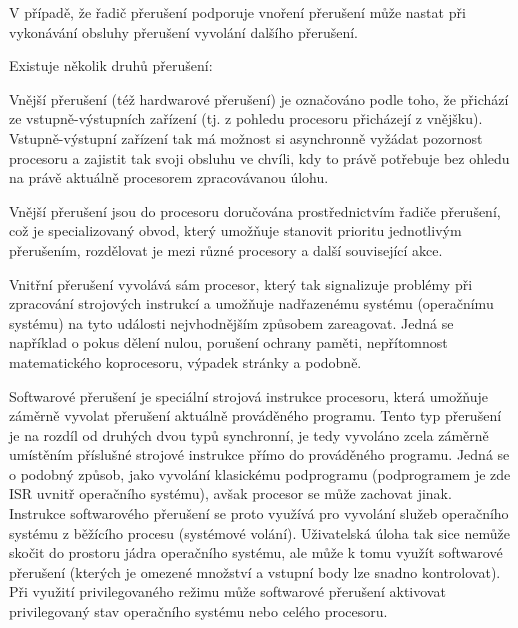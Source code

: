 V případě, že řadič přerušení podporuje vnoření přerušení může nastat při vykonávání obsluhy přerušení vyvolání dalšího přerušení.


Existuje několik druhů přerušení:

\vskip 4mm
\vskip 4mm


Vnější přerušení (též hardwarové přerušení) je označováno podle toho, že přichází ze vstupně-výstupních zařízení (tj. z pohledu procesoru přicházejí z vnějšku). Vstupně-výstupní zařízení tak má možnost si asynchronně vyžádat pozornost procesoru a zajistit tak svoji obsluhu ve chvíli, kdy to právě potřebuje bez ohledu na právě aktuálně procesorem zpracovávanou úlohu.

Vnější přerušení jsou do procesoru doručována prostřednictvím řadiče přerušení, což je specializovaný obvod, který umožňuje stanovit prioritu jednotlivým přerušením, rozdělovat je mezi různé procesory a další související akce.


Vnitřní přerušení vyvolává sám procesor, který tak signalizuje problémy při zpracování strojových instrukcí a umožňuje nadřazenému systému (operačnímu systému) na tyto události nejvhodnějším způsobem zareagovat. Jedná se například o pokus dělení nulou, porušení ochrany paměti, nepřítomnost matematického koprocesoru, výpadek stránky a podobně.


Softwarové přerušení je speciální strojová instrukce procesoru, která umožňuje záměrně vyvolat přerušení aktuálně prováděného programu. Tento typ přerušení je na rozdíl od druhých dvou typů synchronní, je tedy vyvoláno zcela záměrně umístěním příslušné strojové instrukce přímo do prováděného programu. Jedná se o podobný způsob, jako vyvolání klasickému podprogramu (podprogramem je zde ISR uvnitř operačního systému), avšak procesor se může zachovat jinak. Instrukce softwarového přerušení se proto využívá pro vyvolání služeb operačního systému z běžícího procesu (systémové volání). Uživatelská úloha tak sice nemůže skočit do prostoru jádra operačního systému, ale může k tomu využít softwarové přerušení (kterých je omezené množství a vstupní body lze snadno kontrolovat). Při využití privilegovaného režimu může softwarové přerušení aktivovat privilegovaný stav operačního systému nebo celého procesoru.


